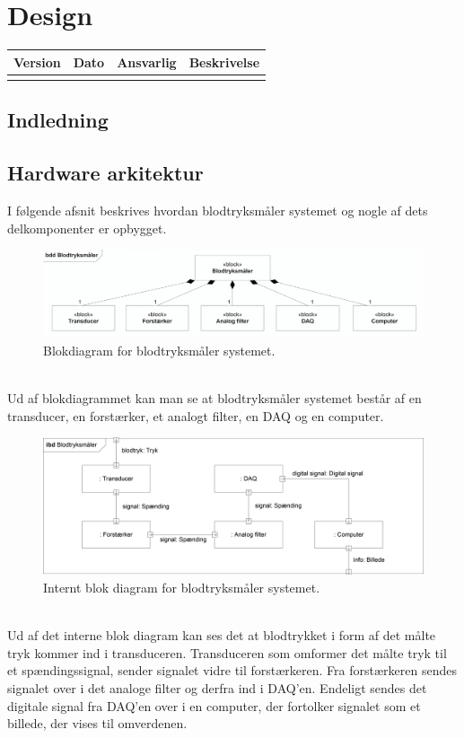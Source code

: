 \chapter{Design}

\begin{longtabu} to 
    Version &    Dato &    Ansvarlig &    Beskrivelse\\[-1ex]
    \midrule
    
\label{version_Systemark}
\end{longtabu}

\section{Indledning}

  
\section{Hardware arkitektur}
I følgende afsnit beskrives hvordan blodtryksmåler systemet og nogle af dets delkomponenter er opbygget.
\\
\begin{figure}[h]
	\centering
	\includegraphics[width=1\textwidth]{Figurer/BDD}
	\caption{Blokdiagram for blodtryksmåler systemet.}\label{labelpic}
\end{figure}
\\Ud af blokdiagrammet kan man se at blodtryksmåler systemet består af en transducer, en forstærker, et analogt filter, en DAQ og en computer.
\\
\begin{figure}[h]
	\centering
	\includegraphics[width=1\textwidth]{Figurer/IBD}
	\caption{Internt blok diagram for blodtryksmåler systemet.}\label{labelpic}
\end{figure}
\\Ud af det interne blok diagram kan ses det at blodtrykket i form af det målte tryk kommer ind i transduceren. Transduceren som omformer det målte tryk til et spændingssignal, sender signalet vidre til forstærkeren. Fra forstærkeren sendes signalet over i det analoge filter og derfra ind i DAQ'en. Endeligt sendes det digitale signal fra DAQ'en over i en computer, der fortolker signalet som et billede, der vises til omverdenen.


